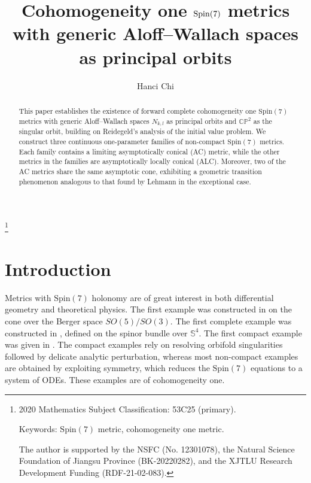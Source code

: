 \documentclass[11pt,letterpaper]{amsart}
\title{Cohomogeneity one $\spin(7)$ metrics with generic Aloff--Wallach spaces as principal orbits}
\author{Hanci Chi}
\theoremstyle{definition}
\numberwithin{equation}{section}
\newcommand{\spin}{\mathrm{Spin}}
\begin{document}
\maketitle
\begin{abstract}
This paper establishes the existence of forward complete cohomogeneity one $\mathrm{Spin}(7)$ metrics with generic Aloff--Wallach spaces $N_{k,l}$ as principal orbits and $\mathbb{CP}^2$ as the singular orbit, building on Reidegeld’s analysis of the initial value problem. We construct three continuous one-parameter families of non-compact $\mathrm{Spin}(7)$ metrics. Each family contains a limiting asymptotically conical (AC) metric, while the other metrics in the families are asymptotically locally conical (ALC). Moreover, two of the AC metrics share the same asymptotic cone, exhibiting a geometric transition phenomenon analogous to that found by Lehmann in the exceptional case.
\end{abstract}
\let\thefootnote\relax\footnote{2020 Mathematics Subject Classification: 53C25 (primary).

Keywords: $\spin(7)$ metric, cohomogeneity one metric.

The author is supported by the NSFC (No. 12301078), the Natural Science Foundation of Jiangsu Province (BK-20220282), and the XJTLU Research Development Funding (RDF-21-02-083).}




\section{Introduction}
Metrics with $\spin(7)$ holonomy are of great interest in both differential geometry and theoretical physics. The first example was constructed in \cite{bryant_metrics_1987} on the cone over the Berger space $SO(5)/SO(3)$. The first complete example was constructed in \cite{bryant_construction_1989}, defined on the spinor bundle over $\mathbb{S}^4$. The first compact example was given in \cite{joyce_new_1999}. The compact examples rely on resolving orbifold singularities followed by delicate analytic perturbation, whereas most non-compact examples are obtained by exploiting symmetry, which reduces the $\spin(7)$ equations to a system of ODEs. These examples are of cohomogeneity one.
\end{document}
